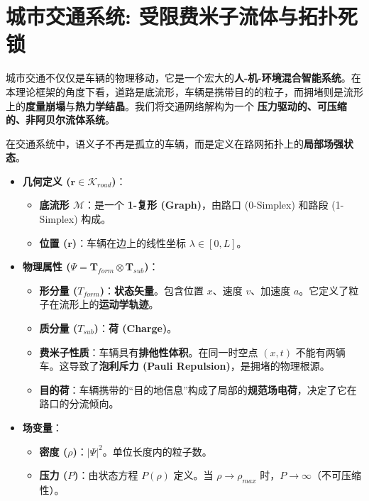 \section{城市交通系统: 受限费米子流体与拓扑死锁}
\label{sec:section_9110}

城市交通不仅仅是车辆的物理移动，它是一个宏大的\textbf{人-机-环境混合智能系统}。在本理论框架的角度下看，道路是底流形，车辆是携带目的的粒子，而拥堵则是流形上的\textbf{度量崩塌}与\textbf{热力学结晶}。我们将交通网络解构为一个 \textbf{压力驱动的、可压缩的、非阿贝尔流体系统}。





在交通系统中，语义子不再是孤立的车辆，而是定义在路网拓扑上的\textbf{局部场强状态}。

\begin{itemize}
    \item   \textbf{几何定义 ($\mathbf{r} \in \mathcal{K}_{road}$)}：
    \begin{itemize}
        \item   \textbf{底流形 $\mathcal{M}$}：是一个 \textbf{1-复形 (Graph)}，由路口 (0-Simplex) 和路段 (1-Simplex) 构成。
        \item   \textbf{位置 ($\mathbf{r}$)}：车辆在边上的线性坐标 $\lambda \in [0, L]$。
    \end{itemize}

    \item   \textbf{物理属性 ($\Psi = \mathbf{T}_{form} \otimes \mathbf{T}_{sub}$)}：
    \begin{itemize}
        \item   \textbf{形分量 ($T_{form}$)}：\textbf{状态矢量}。包含位置 $x$、速度 $v$、加速度 $a$。它定义了粒子在流形上的\textbf{运动学轨迹}。
        \item   \textbf{质分量 ($T_{sub}$)}：\textbf{荷 (Charge)}。
        \item   \textbf{费米子性质}：车辆具有\textbf{排他性体积}。在同一时空点 $(x,t)$ 不能有两辆车。这导致了\textbf{泡利斥力 (Pauli Repulsion)}，是拥堵的物理根源。
        \item   \textbf{目的荷}：车辆携带的“目的地信息”构成了局部的\textbf{规范场电荷}，决定了它在路口的分流倾向。
    \end{itemize}

    \item   \textbf{场变量}：
    \begin{itemize}
        \item   \textbf{密度 ($\rho$)}：$|\Psi|^2$。单位长度内的粒子数。
        \item   \textbf{压力 ($P$)}：由状态方程 $P(\rho)$ 定义。当 $\rho \to \rho_{max}$ 时，$P \to \infty$（不可压缩性）。
    \end{itemize}
\end{itemize}



